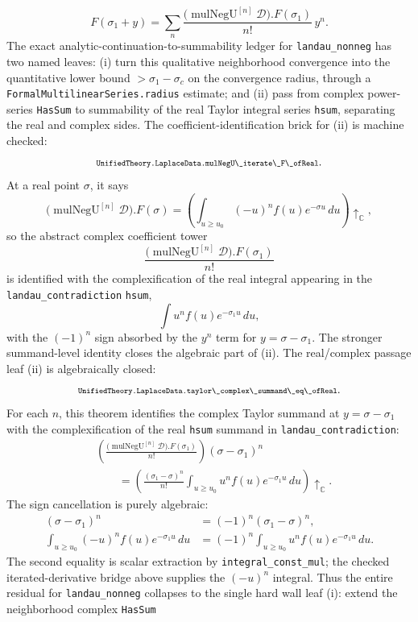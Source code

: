 \documentclass[11pt]{article}
\newcommand{\lean}[1]{\relax\ifmmode\hbox{\scriptsize\ttfamily\detokenize{#1}}\else{\small\texttt{\detokenize{#1}}}\fi}
\begin{document}
$$
  F(\sigma_1+y)=
  \sum_n
  \frac{
    \big(\operatorname{mulNegU}^{[n]}\mathcal D\big).F(\sigma_1)
  }{n!}\,y^n.
$$
The exact analytic-continuation-to-summability ledger for \texttt{landau\_nonneg} has two named leaves: (i) turn this qualitative neighborhood convergence into the quantitative lower bound $>\sigma_1-\sigma_c$ on the convergence radius, through a \texttt{FormalMultilinearSeries.radius} estimate; and (ii) pass from complex power-series \texttt{HasSum} to summability of the real Taylor integral series \texttt{hsum}, separating the real and complex sides.  The coefficient-identification brick for (ii) is machine checked:
$$
  \lean{UnifiedTheory.LaplaceData.mulNegU\_iterate\_F\_ofReal}.
$$
At a real point $\sigma$, it says
$$
  \big(\operatorname{mulNegU}^{[n]}\mathcal D\big).F(\sigma)
  =
  \left(
    \int_{u\ge u_0}(-u)^n f(u)e^{-\sigma u}\,du
  \right)\!\uparrow_{\mathbb C},
$$
so the abstract complex coefficient tower
$$
  \frac{\big(\operatorname{mulNegU}^{[n]}\mathcal D\big).F(\sigma_1)}{n!}
$$
is identified with the complexification of the real integral appearing in the \texttt{landau\_contradiction} \texttt{hsum},
$$
  \int u^n f(u)e^{-\sigma_1 u}\,du,
$$
with the $(-1)^n$ sign absorbed by the $y^n$ term for $y=\sigma-\sigma_1$.  The stronger summand-level identity closes the algebraic part of (ii).
The real/complex passage leaf (ii) is algebraically closed:
$$
  \lean{UnifiedTheory.LaplaceData.taylor\_complex\_summand\_eq\_ofReal}.
$$
For each $n$, this theorem identifies the complex Taylor summand at $y=\sigma-\sigma_1$ with the complexification of the real \texttt{hsum} summand in \texttt{landau\_contradiction}:
$$
\begin{aligned}
  &\left(
    \frac{
      \big(\operatorname{mulNegU}^{[n]}\mathcal D\big).F(\sigma_1)
    }{n!}
  \right)(\sigma-\sigma_1)^n \\
  &\qquad =
  \left(
    \frac{(\sigma_1-\sigma)^n}{n!}
    \int_{u\ge u_0}u^n f(u)e^{-\sigma_1 u}\,du
  \right)\!\uparrow_{\mathbb C}.
\end{aligned}
$$
The sign cancellation is purely algebraic:
$$
\begin{aligned}
  (\sigma-\sigma_1)^n
  &=(-1)^n(\sigma_1-\sigma)^n,\\
  \int_{u\ge u_0}(-u)^n f(u)e^{-\sigma_1 u}\,du
  &=(-1)^n
    \int_{u\ge u_0}u^n f(u)e^{-\sigma_1 u}\,du.
\end{aligned}
$$
The second equality is scalar extraction by \texttt{integral\_const\_mul}; the checked iterated-derivative bridge above supplies the $(-u)^n$ integral.  Thus the entire residual for \texttt{landau\_nonneg} collapses to the single hard wall leaf (i): extend the neighborhood complex \texttt{HasSum}
\end{document}
